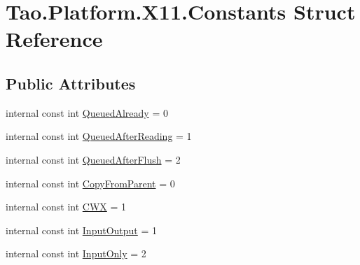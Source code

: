 \hypertarget{struct_tao_1_1_platform_1_1_x11_1_1_constants}{
\section{Tao.Platform.X11.Constants Struct Reference}
\label{struct_tao_1_1_platform_1_1_x11_1_1_constants}
}
\subsection*{Public Attributes}
\begin{DoxyCompactItemize}
\item 
internal const int \hyperlink{struct_tao_1_1_platform_1_1_x11_1_1_constants_a9646aa421036b0bf4e623c4ce091131f}{QueuedAlready} = 0
\item 
internal const int \hyperlink{struct_tao_1_1_platform_1_1_x11_1_1_constants_a78d7be835b5c5604b45393ce44e710b5}{QueuedAfterReading} = 1
\item 
internal const int \hyperlink{struct_tao_1_1_platform_1_1_x11_1_1_constants_a8060ac838e44e2bc58951eb322f7c7c3}{QueuedAfterFlush} = 2
\item 
internal const int \hyperlink{struct_tao_1_1_platform_1_1_x11_1_1_constants_a05696b30cac01cc03774c5524e23cbfd}{CopyFromParent} = 0
\item 
internal const int \hyperlink{struct_tao_1_1_platform_1_1_x11_1_1_constants_ad50b8f27e32c5c2eabb8f13203dab933}{CWX} = 1
\item 
internal const int \hyperlink{struct_tao_1_1_platform_1_1_x11_1_1_constants_a6f3227d40d1193df46290e2551acf852}{InputOutput} = 1
\item 
internal const int \hyperlink{struct_tao_1_1_platform_1_1_x11_1_1_constants_a6d5fc4dd7bae2fd683224655b3a076e7}{InputOnly} = 2
\end{DoxyCompactItemize}


